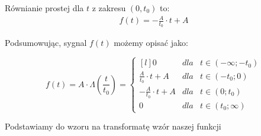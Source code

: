 \begin{task}
Równianie prostej dla $t$ z zakresu  $(0,t_{0})$ to:
\begin{align*}
f(t) = -\frac{A}{t_{0}}\cdot t + A
\end{align*}

Podsumowując, sygnal $f(t)$ możemy opisać jako:

\begin{equation}
f(t) = A \cdot \Lambda(\frac{t}{t_{0}}) = \left\{\begin{matrix*}[l]
0 & dla & t \in \left(-\infty; -t_{0}\right)\\
\frac{A}{t_{0}} \cdot t + A & dla & t \in \left(-t_{0}; 0\right)\\
-\frac{A}{t_{0}} \cdot t + A & dla & t \in \left(0; t_{0}\right)\\
0 & dla & t \in \left(t_{0};\infty\right)
\end{matrix*}\right.
\end{equation}

Podstawiamy do wzoru na transformatę wzór naszej funkcji


\end{task}
